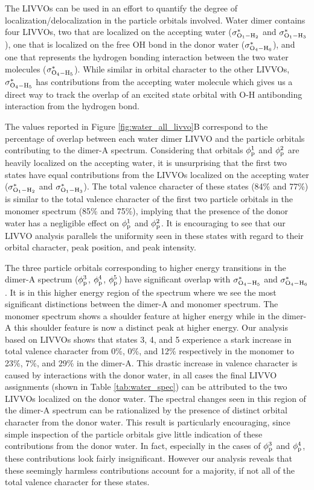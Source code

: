 \documentclass{article}
\begin{document}
The LIVVOs can be used in an effort to quantify the degree of localization/delocalization in the particle orbitals involved. Water dimer contains four LIVVOs, two that are localized on the accepting water ($\sigma^*_{\rm O_1-H_2}$ and $\sigma^*_{\rm O_1-H_3}$), one that is localized on the free OH bond in the donor water ($\sigma^*_{\rm O_4-H_6}$), and one that represents the hydrogen bonding interaction between the two water molecules ($\sigma^*_{\rm O_4-H_5}$).
While similar in orbital character to the other LIVVOs,  $\sigma^*_{\rm O_4-H_5}$ has contributions from the accepting water molecule which gives us a direct way to track the overlap of an excited state orbital with O-H antibonding interaction from the hydrogen bond.

The values reported in Figure \ref{fig:water_all_livvo}B correspond to the percentage of overlap between each water dimer LIVVO and the  particle orbitals contributing to the dimer-A spectrum. Considering that orbitals $\phi_{\rm p}^1$ and $\phi_{\rm p}^2$ are heavily localized on the accepting water, it is unsurprising that the first two states have equal contributions from the LIVVOs localized on the accepting water ($\sigma^*_{\rm O_1-H_2}$ and $\sigma^*_{\rm O_1-H_3}$). The total valence character of these states (84\% and 77\%) is similar to the total valence character of the first two particle orbitals in the monomer spectrum (85\% and 75\%), implying that the presence of the donor water has a negligible effect on $\phi_{\rm p}^1$ and $\phi_{\rm p}^2$. It is encouraging to see that our LIVVO analysis parallels the uniformity seen in these states with regard to their orbital character, peak position, and peak intensity.

The three particle orbitals corresponding to higher energy transitions in the dimer-A spectrum ($\phi_{\rm p}^3$, $\phi_{\rm p}^4$, $\phi_{\rm p}^5$) have significant overlap with $\sigma^*_{\rm O_4-H_5}$ and $\sigma^*_{\rm O_4-H_6}$. It is in this higher energy region of the spectrum where we see the most significant distinctions between the dimer-A and monomer spectrum. The monomer spectrum shows a shoulder feature at higher energy while in the dimer-A this shoulder feature is now a distinct peak at higher energy. Our analysis based on LIVVOs shows that states 3, 4, and 5 experience a stark increase in total valence character from 0\%, 0\%, and 12\% respectively in the monomer to 23\%, 7\%, and 29\% in the dimer-A. This drastic increase in valence character is caused by interactions with the donor water, in all cases the final LIVVO assignments (shown in Table \ref{tab:water_spec}) can be attributed to the two LIVVOs localized on the donor water. The spectral changes seen in this region of the dimer-A spectrum can be rationalized by the presence of distinct orbital character from the donor water. This result is particularly encouraging, since simple inspection of the particle orbitals give little indication of these contributions from the donor water. In fact, especially in the cases of $\phi_{\rm p}^3$ and $\phi_{\rm p}^4$, these contributions look fairly insignificant. However our analysis reveals that these seemingly harmless contributions account for a majority, if not all of the total valence character for these states.
\end{document}
